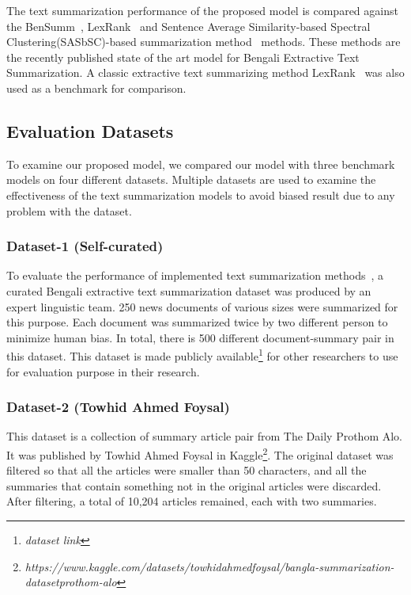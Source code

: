 The text summarization performance of the proposed model is compared against
the BenSumm~\cite{chowdhury-etal-2021-tfidf-clustering}, LexRank~\cite{Erkan-lexRank-2004} and Sentence
Average Similarity-based Spectral Clustering(SASbSC)-based summarization
method~\cite{roychowdhury-etal-2022-spectral-base} methods.
These methods are the recently published state of the art model for Bengali Extractive Text Summarization.
A classic extractive text summarizing method LexRank~\cite{Erkan-lexRank-2004} was also used as a benchmark for comparison.

\subsection{Evaluation Datasets}\label{subsec:evaluation-datasets}
To examine our proposed model, we compared our model with three benchmark models on four different datasets.
Multiple datasets are used to examine the effectiveness of the text summarization
models to avoid biased result due to any problem with the dataset.

\subsubsection{Dataset-1 (Self-curated)}
To evaluate the performance of implemented text summarization
methods~\cite{chowdhury-etal-2021-tfidf-clustering,Erkan-lexRank-2004,roychowdhury-etal-2022-spectral-base},
a curated Bengali extractive text summarization dataset was produced by an expert linguistic team.
250 news documents of various sizes were summarized for this purpose.
Each document was summarized twice by two different person to minimize human bias.
In total, there is 500 different document-summary pair in this dataset.
This dataset is made publicly available\footnote{\textit{dataset link}} for other researchers to use for evaluation
purpose in their research.

\subsubsection{Dataset-2 (Towhid Ahmed Foysal)\cite{ahmed_2023_TAF_dataset}}
This dataset is a collection of summary article pair from The Daily Prothom Alo.
It was published by Towhid Ahmed Foysal in
Kaggle\footnote{\textit{https://www.kaggle.com/datasets/towhidahmedfoysal/bangla-summarization-datasetprothom-alo}}.
The original dataset was filtered so that all the articles were smaller than 50 characters, and all the summaries
that contain something not in the original articles were discarded.
After filtering, a total of 10,204 articles remained, each with two summaries.


